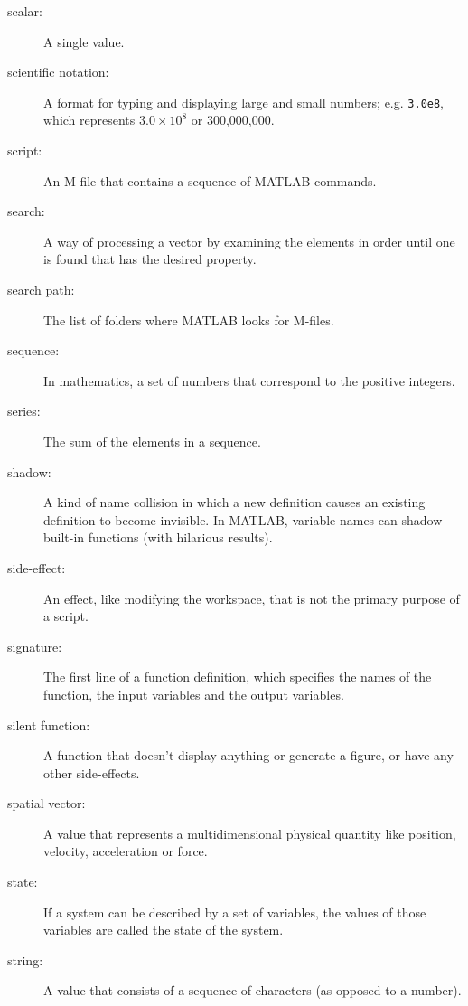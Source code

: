 \begin{description}
\item[scalar:] A single value.

\item[scientific notation:] A format for typing and displaying large
and small numbers; e.g. {\tt 3.0e8}, which represents $3.0 \times 10^8$
or 300,000,000.

\item[script:] An M-file that contains a sequence of MATLAB commands.

\item[search:] A way of processing a vector by examining the
elements in order until one is found that has the desired property.

\item[search path:] The list of folders where MATLAB looks for
M-files.

\item[sequence:] In mathematics, a set of numbers that correspond
to the positive integers.

\item[series:] The sum of the elements in a sequence.

\item[shadow:] A kind of name collision in which a new definition
causes an existing definition to become invisible.  In MATLAB,
variable names can shadow built-in functions (with hilarious results).

\item[side-effect:] An effect, like modifying the workspace, that
is not the primary purpose of a script.

\item[signature:] The first line of a function definition, which
specifies the names of the function, the input variables and the
output variables.

\item[silent function:] A function that doesn't display anything
or generate a figure, or have any other side-effects.

\item[spatial vector:] A value that represents a
multidimensional physical quantity like position, velocity,
acceleration or force.

\item[state:] If a system can be described by a set of variables,
the values of those variables are called the state of the system.

\item[string:] A value that consists of a sequence of characters (as
opposed to a number).


\end{description}
